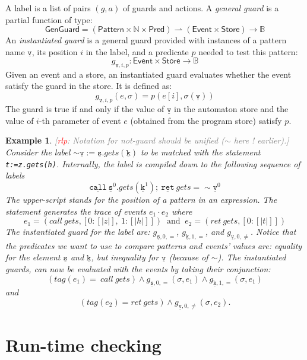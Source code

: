 \documentclass{sigplanconf}[10pt] %
\newcommand{\noterg}[2]{\textcolor{gray}{[\textcolor{red}{#1}: #2]}}
\newcommand{\rlp}[1]{\noterg{rlp}{#1}}
\newcommand{\B}{\ensuremath{\mathbb{B}}}
\newcommand{\N}{\ensuremath{\mathbb{N}}}
\newcommand{\pattern}[1]{\ensuremath{\mathtt{\underline{#1}}}}
\newcommand{\pmap}{\rightharpoonup}
\newcommand{\set}[1]{\ensuremath{\mathsf{#1}}}
\newtheorem{example}{Example}
\begin{document}
A label is a list of pairs $(g,a)$ of guards and actions. A  {\em general guard} is a partial function of type:
\[
\set{GenGuard} = (\set{Pattern} \times \N \times \set{Pred}) \pmap (\set{Event}\times\set{Store}) \to \B
\]
An {\em instantiated guard} is a general guard provided with instances of a pattern  name $\pattern v$,  its position $i$ in the label, and a predicate $p$ needed to test this pattern:
\[
g_{\pattern{v},i,p} : \set{Event}\times\set{Store} \to \B
\]
Given an event and a store, an instantiated guard  evaluates whether the event satisfy the guard in the store. It is defined as:
\newcommand{\sem}[1]{[ \! | #1 | \! ]}
\[
g_{\pattern{v},i,p}(e, \sigma) = p(e[i],\sigma(\pattern v))
\] The guard is true if and only if the value of $\pattern{v}$ in the automaton store
and the value of $i$-th parameter of  event $e$ (obtained from the program store) satisfy $p$.
\begin{example}
\rlp{Notation for not-guard should be unified ($\sim$ here ! earlier).}
Consider the label
 $\sim \pattern {v} := \pattern {s}.gets(\pattern {k})$ to be matched with the statement
 {\tt t:=z.gets(h)}. Internally,  the label is compiled down to the
 following sequence of labels
\[
\pattern{call} \  \pattern{s}^0 .gets(\pattern {k}^1);  \ \pattern{ret} \ gets = \sim \pattern {v}^0
\] The upper-script stands for the position of a pattern in an expression. The statement generates the trace of events $e_1 \cdot e_2$ where
\[
 e_1=(call \ gets, [0: \sem{z}, \ 1: \sem{h}])  \ \mbox{ and }  \  e_2= (ret \ gets, [0: \sem{t}])
\]
The instantiated guard for the label are:
 $g_{\pattern{s},0,=}$, $g_{\pattern{k},1,=}$, and  $g_{\pattern{v},0, \neq}$.
Notice that the predicates we want to use to compare patterns and events' values are: equality for the element $\pattern{s}$ and $\pattern{k}$,
but inequality for \pattern{v} (because of $\sim$).
The instantiated guards, can now be evaluated with the events by taking their conjunction:
\[
 (tag(e_1)= \ call \ gets) \wedge g_{\pattern{s},0,=}(\sigma,e_1) \wedge g_{\pattern{k},1,=}(\sigma, e_1)
\] and
\[
 (tag(e_2)= ret \ gets) \wedge g_{\pattern{v},0,\neq}(\sigma,e_2).
\]
\end{example}


\section{Run-time checking} \label{sec:dynamic} %
\end{document}
